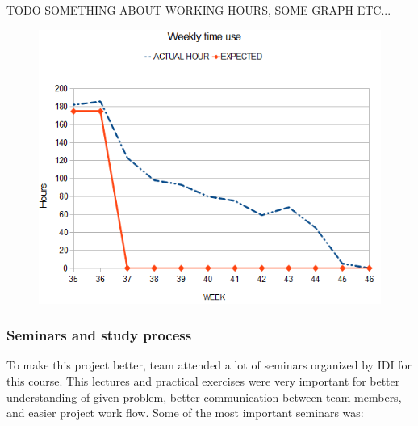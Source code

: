 	TODO SOMETHING ABOUT WORKING HOURS, SOME GRAPH ETC...

    \begin{figure}[htb]
        \centering
        \includegraphics[scale=0.88]{timebudget.png}
        \label{fig:time}
    \end{figure}
	
	\subsubsection{Seminars and study process}
	To make this project better, team attended a lot of seminars organized by IDI for this course. This lectures and practical exercises were very important for better understanding of given problem, better communication between team members, and easier project work flow. Some of the most important seminars was:
	
